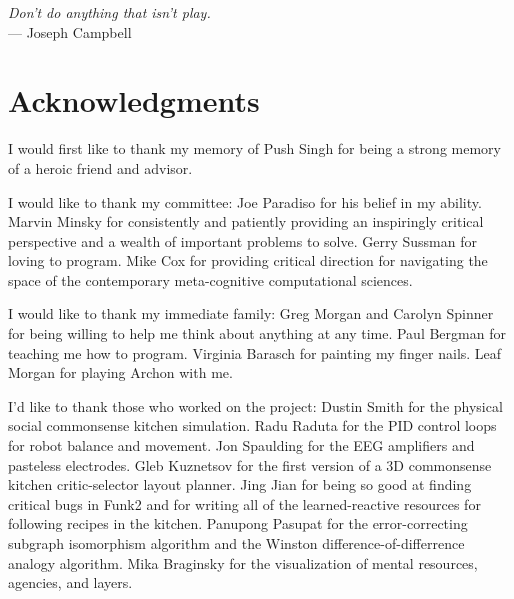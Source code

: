 



\begin{flushright}{\slshape    
Don't do anything that isn't play.} \\ \medskip
    --- Joseph Campbell
\end{flushright}



\bigskip

\begingroup
\let\clearpage\relax
\let\cleardoublepage\relax
\let\cleardoublepage\relax
\chapter*{Acknowledgments}

I would first like to thank my memory of Push Singh for being a strong
memory of a heroic friend and advisor.

\vspace{5mm}

\noindent I would like to thank my committee:
Joe Paradiso for his belief in my ability.
Marvin Minsky for consistently and patiently providing an inspiringly critical perspective and a wealth of important problems to solve.
Gerry Sussman for loving to program.
Mike Cox for providing critical direction for navigating the space of the contemporary meta-cognitive computational sciences.

\vspace{5mm}

\noindent I would like to thank my immediate family:
Greg Morgan and Carolyn Spinner for being willing to help me think about anything at any time.
Paul Bergman for teaching me how to program.
Virginia Barasch for painting my finger nails.
Leaf Morgan for playing Archon with me.

\vspace{5mm}

\noindent I'd like to thank those who worked on the project:
Dustin Smith for the physical social commonsense kitchen simulation.
Radu Raduta for the PID control loops for robot balance and movement.
Jon Spaulding for the EEG amplifiers and pasteless electrodes.
Gleb Kuznetsov for the first version of a 3D commonsense kitchen critic-selector layout planner.
Jing Jian for being so good at finding critical bugs in Funk2 and for writing all of the learned-reactive resources for following recipes in the kitchen.
Panupong Pasupat for the error-correcting subgraph isomorphism algorithm and the Winston difference-of-differrence analogy algorithm.
Mika Braginsky for the visualization of mental resources, agencies, and layers.

